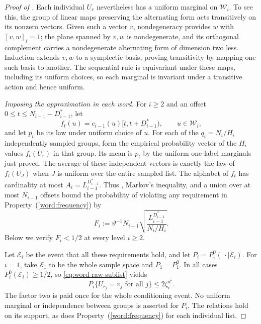 \begin{proof}[Proof of ]
Each individual $U_r$ nevertheless has a uniform marginal on
$\mathcal W_i$.  To see this, the group of linear maps preserving the
alternating form acts transitively on its nonzero vectors.  Given such
a vector $v$, nondegeneracy provides $w$ with $[v,w]_i=1$; the plane
spanned by $v,w$ is nondegenerate, and its orthogonal complement carries
a nondegenerate alternating form of dimension two less.  Induction
extends $v,w$ to a symplectic basis, proving transitivity by mapping one
such basis to another.  The sequential rule is equivariant under these
maps, including its uniform choices, so each marginal is invariant
under a transitive action and hence uniform.

\smallskip\noindent
\emph{Imposing the approximation in each word.}
For $i\ge2$ and an offset $0\le t\le N_{i-1}-D_{i-1}^*$, let
\[
 f_t(u)=c_{i-1}(u)[t,t+D_{i-1}^*),\qquad u\in\mathcal W_i,
\]
and let $p_t$ be its law under uniform choice of $u$.
For each of the $q_i=N_i/H_i$ independently sampled groups, form the
empirical probability vector of the $H_i$ values $f_t(U_r)$ in that
group.  Its mean is $p_t$ by the uniform one-label marginals just proved.
The average of these independent vectors is exactly the law of
$f_t(U_J)$ when $J$ is uniform over the entire sampled list.
The alphabet of $f_t$ has cardinality at most
$A_i=L_{i-1}^{D_{i-1}^*}$.
Thus , Markov's inequality, and a union over at most
$N_{i-1}$ offsets bound the probability of violating any requirement in
Property~(\ref{word:frequency}) by
\begin{equation}\label{eq:word-filter-budget}
  F_i:=\vartheta^{-1}N_{i-1}
       \sqrt{\frac{L_{i-1}^{D_{i-1}^*}}{N_i/H_i}}.
\end{equation}
Below we verify $F_i<1/2$ at every level $i\ge2$.

Let $\mathcal E_i$ be the event that all these requirements hold, and
let $P_i=P_i^0(\,\cdot\mid\mathcal E_i)$.
For $i=1$, take $\mathcal E_1$ to be the whole sample space and
$P_1=P_1^0$.  In all cases $P_i^0(\mathcal E_i)\ge1/2$, so
\eqref{eq:word-raw-sublist} yields
\begin{equation}\label{eq:word-filtered-sublist}
 P_i\{U_{r_j}=v_j\text{ for all }j\}\le2\zeta_i^{d'}.
\end{equation}
The factor two is paid once for the whole conditioning event.
No uniform marginal or independence between groups is asserted for
$P_i$.  The relations hold on its support, as does
Property~(\ref{word:frequency}) for each individual list.


\end{proof}
